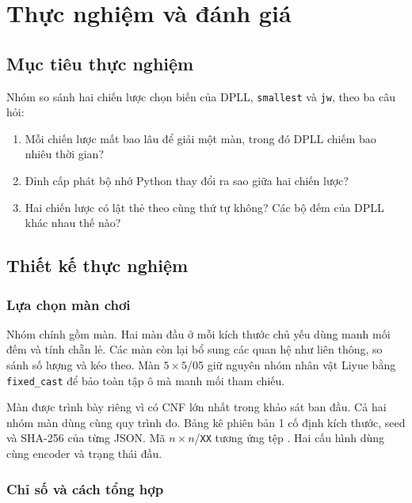 \chapter{Thực nghiệm và đánh giá}
\label{chap:experiments}
\begingroup
\linespread{1.23}\selectfont
\setlength{\intextsep}{9pt}

\section{Mục tiêu thực nghiệm}

Nhóm so sánh hai chiến lược chọn biến của DPLL, \texttt{smallest} và \texttt{jw}, theo ba câu hỏi:
\begin{enumerate}
    \item Mỗi chiến lược mất bao lâu để giải một màn, trong đó DPLL chiếm bao nhiêu thời gian?
    \item Đỉnh cấp phát bộ nhớ Python thay đổi ra sao giữa hai chiến lược?
    \item Hai chiến lược có lật thẻ theo cùng thứ tự không? Các bộ đếm của DPLL khác nhau thế nào?
\end{enumerate}

\section{Thiết kế thực nghiệm}

\subsection{Lựa chọn màn chơi}

Nhóm chính gồm \ExpMainStageCount{} màn. Hai màn đầu ở mỗi kích thước chủ yếu dùng manh mối đếm và tính chẵn lẻ. Các màn còn lại bổ sung các quan hệ như liên thông, so sánh số lượng và kéo theo. Màn \(5\times5\)/05 giữ nguyên nhóm nhân vật Liyue bằng \texttt{fixed\_cast} để bảo toàn tập ô mà manh mối tham chiếu.

Màn \ExpStressLabel{} được trình bày riêng vì có CNF lớn nhất trong khảo sát ban đầu. Cả hai nhóm màn dùng cùng quy trình đo. Bảng kê phiên bản 1 cố định kích thước, seed và SHA-256 của từng JSON. Mã \(n\times n\)/\texttt{XX} tương ứng tệp . Hai cấu hình dùng cùng encoder và trạng thái đầu.

\clearpage
\subsection{Chỉ số và cách tổng hợp}

